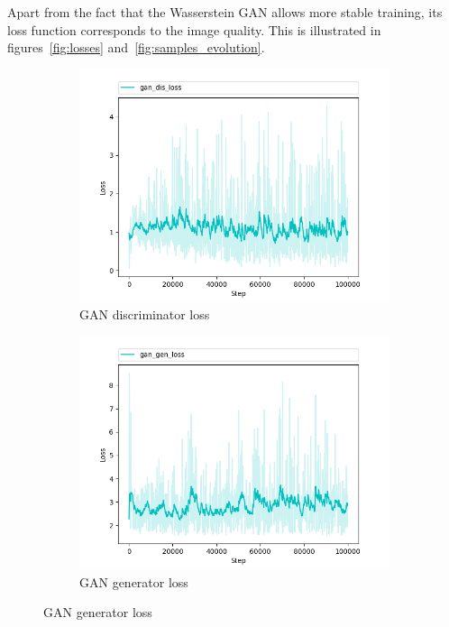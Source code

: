 Apart from the fact that the Wasserstein GAN allows more stable training, its loss function corresponds to the image quality. This is illustrated in figures~\ref{fig:losses} and~\ref{fig:samples_evolution}.

\begin{figure}
  \begin{subfigure}[b]{0.5\textwidth}
    \includegraphics[width=\textwidth]{figures/gan_dis_loss}
    \caption{GAN discriminator loss}
    \label{fig:gan_dis_loss}
  \end{subfigure}
  \hfill
  \begin{subfigure}[b]{0.5\textwidth}
    \includegraphics[width=\textwidth]{figures/gan_gen_loss}
    \caption{GAN generator loss}

\end{subfigure}
\end{figure}
